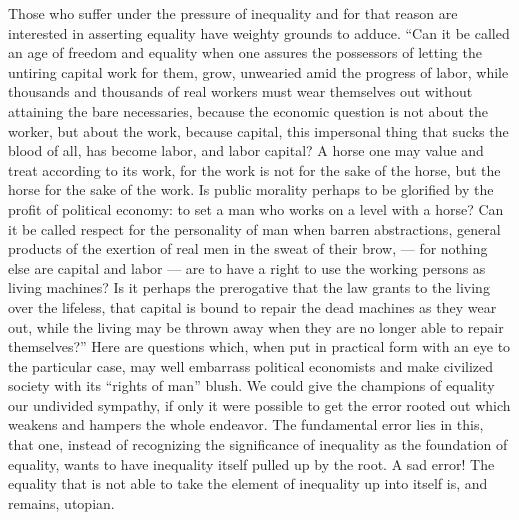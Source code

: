 \documentclass[12pt,a4paper,openany]{book}
\newcommand{\opage}[1]{\marginnote{\footnotesize\textit{[#1]}}}
\begin{document}
Those who suffer under the pressure of inequality and for that reason
are interested in asserting equality have
weighty grounds to adduce. ``Can it be called an age of freedom
and equality when one assures the possessors
of letting the untiring capital work for them, grow,
unwearied amid the progress of labor, while thousands
and thousands of real workers must wear themselves out
without attaining the bare necessaries, because the economic question
is not about the worker, but about the work, because
\setcounter{footnote}{0}%
\opage{147}capital, this impersonal thing that sucks the blood of all, has become
labor, and labor capital? A horse one may value
and treat according to its work, for the work is
not for the sake of the horse, but the horse for the sake of the work.
Is public morality perhaps to be glorified by the
profit of political economy: to set a man who works
on a level with a horse? Can it be called
respect for the personality of man when barren abstractions,
general products of the exertion of real men
in the sweat of their brow, --- for nothing else
are capital and labor --- are to have a right
to use the working persons as living machines?
Is it perhaps the prerogative that the law grants to the living
over the lifeless, that capital is bound to
repair the dead machines as they wear out,
while the living may be thrown away when they are no
longer able to repair themselves?'' Here are
questions which, when put in practical form
with an eye to the particular case, may well embarrass political economists
and make civilized
society with its ``rights of man'' blush.
We could give the champions of equality our undivided
sympathy, if only it were possible to get the
error rooted out which weakens and hampers the whole
endeavor. The fundamental error lies in this, that one,
instead of recognizing the significance of inequality as the foundation
of equality, wants to have inequality itself pulled up
by the root. A sad error! The equality that
is not able to take the element of inequality up into itself is, and
remains, utopian.
\end{document}
